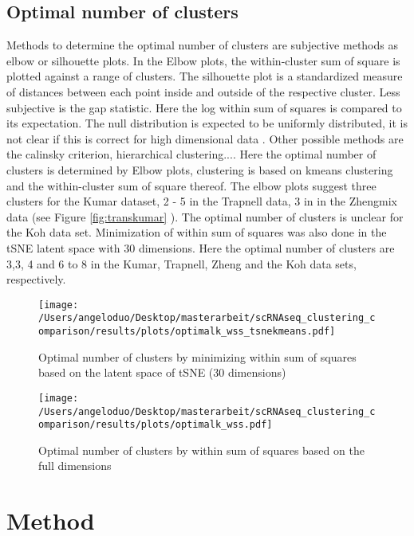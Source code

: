 \documentclass[11pt, a4paper]{article}\usepackage[]{graphicx}\usepackage[]{color}
\begin{document}
\subsection{Optimal number of clusters}
Methods to determine the optimal number of clusters are subjective methods as elbow or silhouette plots. In the Elbow plots, the within-cluster sum of square is plotted against a range of clusters. The silhouette plot is a standardized measure of distances between each point inside and outside of the respective cluster. Less subjective is the gap statistic. Here the log within sum of squares is compared to its expectation. The null distribution is expected to be uniformly distributed, it is not clear if this is correct for high dimensional data \citep{tibshirani2001estimating}. Other possible methods are the calinsky criterion, hierarchical clustering....
Here the optimal number of clusters is determined by Elbow plots, clustering is based on kmeans clustering and the within-cluster sum of square thereof.
The elbow plots suggest three clusters for the Kumar dataset, 2 - 5 in the Trapnell data, 3 in in the Zhengmix data (see Figure \ref{fig:transkumar} ). The optimal number of clusters is unclear for the Koh data set. 
Minimization of within sum of squares was also done in the tSNE latent space with 30 dimensions. Here the optimal number of clusters are 3,3, 4 and 6 to 8  in the Kumar, Trapnell, Zheng and the Koh data sets, respectively.

\begin{figure}[!h]
\texttt{[image: /Users/angeloduo/Desktop/masterarbeit/scRNAseq\_clustering\_comparison/results/plots/optimalk\_wss\_tsnekmeans.pdf]}
\caption{Optimal number of clusters by minimizing within sum of squares based on the latent space of tSNE (30 dimensions) }
\label{fig:wsstsne}
\end{figure}

\begin{figure}[!h]
\texttt{[image: /Users/angeloduo/Desktop/masterarbeit/scRNAseq\_clustering\_comparison/results/plots/optimalk\_wss.pdf]}
\caption{Optimal number of clusters by within sum of squares based on the full dimensions }
\label{fig:wssorg}
\end{figure}

\newpage
\section{Method}
\end{document}
